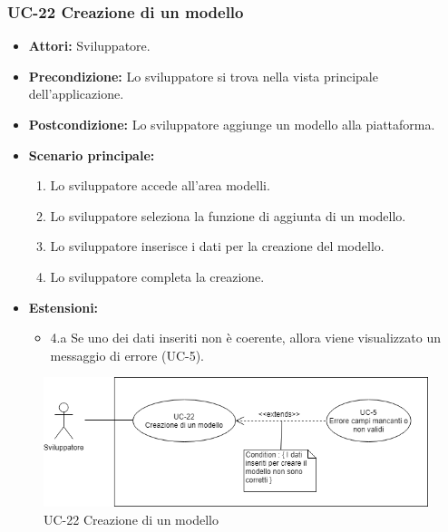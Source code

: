 	\subsubsection{UC-22 Creazione di un modello}		
		\begin{itemize}
			\item \textbf{Attori:} Sviluppatore.
			\item \textbf{Precondizione:} Lo sviluppatore si trova nella vista principale dell'applicazione.
			\item \textbf{Postcondizione:} Lo sviluppatore aggiunge un modello alla piattaforma.
			\item \textbf{Scenario principale:}
			\begin{enumerate}
				\item Lo sviluppatore accede all'area modelli.
				\item Lo sviluppatore seleziona la funzione di aggiunta di un modello.
				\item Lo sviluppatore inserisce i dati per la creazione del modello.
				\item Lo sviluppatore completa la creazione.
			\end{enumerate}
			\item \textbf{Estensioni:}
				\begin{itemize}
					\item 4.a Se uno dei dati inseriti non è coerente, allora viene visualizzato un messaggio di errore (UC-5).
				\end{itemize}
		\end{itemize}
		
		\begin{figure}[h]
			\centering
			\includegraphics[scale=0.7]{images/UC-22.png}
				\caption{UC-22 Creazione di un modello}
		\end{figure}	
	